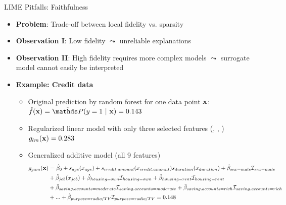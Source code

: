 \documentclass[11pt,compress,t,notes=noshow, aspectratio=169, xcolor=table]{beamer}
\newcommand{\betah}{\hat{\beta}}
\begin{document}
\begin{vbframe}[c]{LIME Pitfalls: Faithfulness}
\begin{itemize}
\itemsep1em
	\item \textbf{Problem}: Trade-off between local fidelity vs. sparsity
	\item \textbf{Observation I}: Low fidelity $\leadsto$ unreliable explanations
	\item \textbf{Observation II}: High fidelity requires more complex models $\leadsto$ surrogate model cannot easily be interpreted
	\item \textbf{Example: Credit data} 
	\begin{itemize}
	    \item Original prediction by random forest for one data point $\xv$: $\fh(\xv) = \hat{\P}(y = 1 ~|~ \xv) = 0.143$
	    \item Regularized linear model with only three selected features (, , ) $g_{lm}(\xv) = 0.283$
	    \item Generalized additive model (all 9 features) 
    \begin{equation*} 
    \begin{split}
    g_{gam}(\xv) & = \betah_0 + s_{age}(x_{age}) +s_{credit.amount}(x_{credit.amount}) s_{duration}(x_{duration}) + \betah_{sex = male} \Ind_{sex = male}   \\
    & + \betah_{job}(x_{job}) + \betah_{housing = own} \Ind_{housing = own} +   \betah_{housing = rent} \Ind_{housing = rent} \\
    & + \betah_{saving.accounts = moderate} \Ind_{saving.accounts = moderate} + \betah_{saving.accounts = rich} \Ind_{saving.accounts = rich} \\
    & + ... + \betah_{purpose = radio/TV} \Ind_{purpose = radio/TV}  = 0.148 
    \end{split}
    \end{equation*}
	\end{itemize}
\end{itemize}

\end{vbframe}
\end{document}
